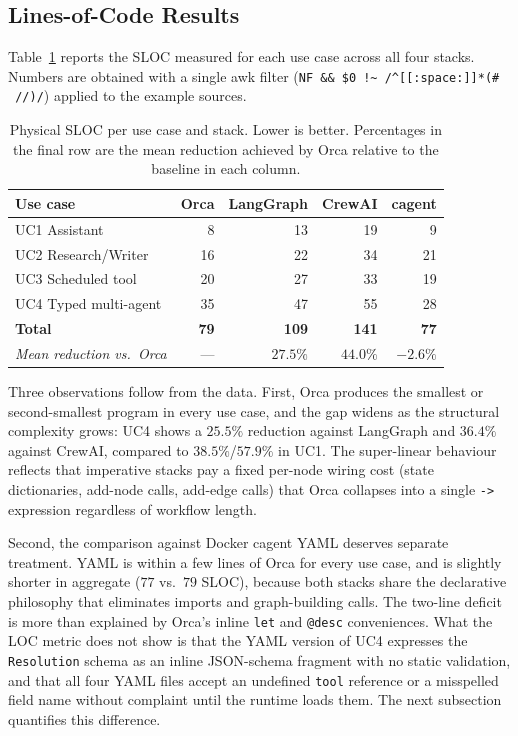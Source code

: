 \documentclass[sigconf,nonacm]{acmart}
\begin{document}
\subsection{Lines-of-Code Results}
\label{sec:evaluation:loc}

Table~\ref{tab:loc-results} reports the SLOC measured for each use case
across all four stacks. Numbers are obtained with a single awk filter
(\texttt{NF \&\& \$0 !\textasciitilde\ /\textasciicircum [[:space:]]*(\# \textbar\textbar\ //)/})
applied to the example sources.

\begin{table}[t]
  \centering
  \caption{Physical SLOC per use case and stack. Lower is better.
  Percentages in the final row are the mean reduction achieved by Orca
  relative to the baseline in each column.}
  \label{tab:loc-results}
  \small
  \begin{tabular}{@{}lrrrr@{}}
    \toprule
    \textbf{Use case} & \textbf{Orca} & \textbf{LangGraph} & \textbf{CrewAI} & \textbf{cagent} \\
    \midrule
    UC1 Assistant              & 8  & 13  & 19  & 9  \\
    UC2 Research/Writer        & 16 & 22  & 34  & 21 \\
    UC3 Scheduled tool         & 20 & 27  & 33  & 19 \\
    UC4 Typed multi-agent      & 35 & 47  & 55  & 28 \\
    \midrule
    \textbf{Total}             & \textbf{79} & \textbf{109} & \textbf{141} & \textbf{77} \\
    \textit{Mean reduction vs.\ Orca} & --- & $27.5\%$ & $44.0\%$ & $-2.6\%$ \\
    \bottomrule
  \end{tabular}
\end{table}

Three observations follow from the data. First, Orca produces the smallest
or second-smallest program in every use case, and the gap widens as the
structural complexity grows: UC4 shows a $25.5\%$ reduction against
LangGraph and $36.4\%$ against CrewAI, compared to $38.5\%$/$57.9\%$ in
UC1. The super-linear behaviour reflects that imperative stacks pay a
fixed per-node wiring cost (state dictionaries, add-node calls,
add-edge calls) that Orca collapses into a single \texttt{->} expression
regardless of workflow length.

Second, the comparison against Docker cagent YAML deserves separate
treatment. YAML is within a few lines of Orca for every use case, and is
slightly shorter in aggregate ($77$ vs.\ $79$ SLOC), because both stacks
share the declarative philosophy that eliminates imports and graph-building
calls. The two-line deficit is more than explained by Orca's inline
\texttt{let} and \texttt{@desc} conveniences. What the LOC metric does not
show is that the YAML version of UC4 expresses the \texttt{Resolution}
schema as an inline JSON-schema fragment with no static validation, and
that all four YAML files accept an undefined \texttt{tool} reference or a
misspelled field name without complaint until the runtime loads them. The
next subsection quantifies this difference.
\end{document}
